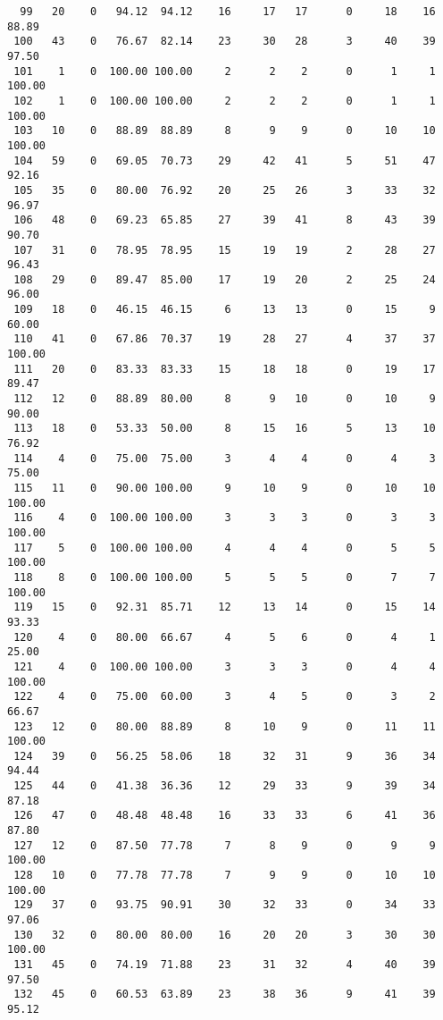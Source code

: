 \begin{verbatim}
  99   20    0   94.12  94.12    16     17   17      0     18    16    88.89
 100   43    0   76.67  82.14    23     30   28      3     40    39    97.50
 101    1    0  100.00 100.00     2      2    2      0      1     1   100.00
 102    1    0  100.00 100.00     2      2    2      0      1     1   100.00
 103   10    0   88.89  88.89     8      9    9      0     10    10   100.00
 104   59    0   69.05  70.73    29     42   41      5     51    47    92.16
 105   35    0   80.00  76.92    20     25   26      3     33    32    96.97
 106   48    0   69.23  65.85    27     39   41      8     43    39    90.70
 107   31    0   78.95  78.95    15     19   19      2     28    27    96.43
 108   29    0   89.47  85.00    17     19   20      2     25    24    96.00
 109   18    0   46.15  46.15     6     13   13      0     15     9    60.00
 110   41    0   67.86  70.37    19     28   27      4     37    37   100.00
 111   20    0   83.33  83.33    15     18   18      0     19    17    89.47
 112   12    0   88.89  80.00     8      9   10      0     10     9    90.00
 113   18    0   53.33  50.00     8     15   16      5     13    10    76.92
 114    4    0   75.00  75.00     3      4    4      0      4     3    75.00
 115   11    0   90.00 100.00     9     10    9      0     10    10   100.00
 116    4    0  100.00 100.00     3      3    3      0      3     3   100.00
 117    5    0  100.00 100.00     4      4    4      0      5     5   100.00
 118    8    0  100.00 100.00     5      5    5      0      7     7   100.00
 119   15    0   92.31  85.71    12     13   14      0     15    14    93.33
 120    4    0   80.00  66.67     4      5    6      0      4     1    25.00
 121    4    0  100.00 100.00     3      3    3      0      4     4   100.00
 122    4    0   75.00  60.00     3      4    5      0      3     2    66.67
 123   12    0   80.00  88.89     8     10    9      0     11    11   100.00
 124   39    0   56.25  58.06    18     32   31      9     36    34    94.44
 125   44    0   41.38  36.36    12     29   33      9     39    34    87.18
 126   47    0   48.48  48.48    16     33   33      6     41    36    87.80
 127   12    0   87.50  77.78     7      8    9      0      9     9   100.00
 128   10    0   77.78  77.78     7      9    9      0     10    10   100.00
 129   37    0   93.75  90.91    30     32   33      0     34    33    97.06
 130   32    0   80.00  80.00    16     20   20      3     30    30   100.00
 131   45    0   74.19  71.88    23     31   32      4     40    39    97.50
 132   45    0   60.53  63.89    23     38   36      9     41    39    95.12

\end{verbatim}
